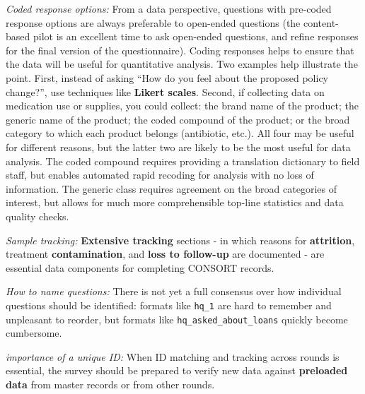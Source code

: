 \textit{Coded response options:}
From a data perspective, questions with pre-coded response options are always preferable to open-ended questions (the content-based pilot is an excellent time to ask open-ended questions, and refine responses for the final version of the questionnaire). Coding responses helps to ensure that the data will be useful for quantitative analysis. Two examples help illustrate the point. First, instead of asking ``How do you feel about the proposed policy change?'', use techniques like 
\textbf{Likert scales}. Second, if collecting data on medication use or supplies, you could collect: the brand name of the product; the generic name of the product; the coded compound of the product; or the broad category to which each product belongs (antibiotic, etc.). All four may be useful for different reasons, but the latter two are likely to be the most useful for data analysis. The coded compound requires providing a translation dictionary to field staff, but enables automated rapid recoding for analysis with no loss of information. The generic class requires agreement on the broad categories of interest, but allows for much more comprehensible top-line statistics and data quality checks.

\textit{Sample tracking:}
\textbf{Extensive tracking} sections - in which reasons for \textbf{attrition}, treatment \textbf{contamination}, and \textbf{loss to follow-up} are documented -
are essential data components for completing CONSORT records. 

\textit{How to name questions:}
There is not yet a full consensus over how individual questions should be identified:
formats like \texttt{hq\_1} are hard to remember and unpleasant to reorder,
but formats like \texttt{hq\_asked\_about\_loans} quickly become cumbersome.

\textit{importance of a unique ID:}
When ID matching and tracking across rounds is essential, the survey should be prepared to verify new data
against \textbf{preloaded data} from master records or from other rounds.

